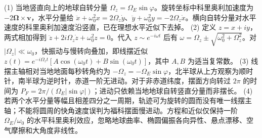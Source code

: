 (1) 当地竖直向上的地球自转分量 \(\Omega_z=\Omega_E\sin\varphi\)。旋转坐标中科里奥利加速度为 \(-2\boldsymbol\Omega\times\boldsymbol v\)，水平分量给 \(\ddot x+\omega_0^2x=2\Omega_z\dot y\)、\(\ddot y+\omega_0^2y=-2\Omega_z\dot x\)。横向自转分量对水平速度的科里奥利加速度沿竖直，已在理想水平近似下去掉。
(2) 定义 \(z=x+iy\)，两式相加得到 \(\ddot z+2i\Omega_z\dot z+\omega_0^2z=0\)。代入 \(z\sim e^{-i\omega t}\) 后有 \(\omega=\Omega_z\pm\sqrt{\omega_0^2+\Omega_z^2}\)。对 \(|\Omega_z|\ll\omega_0\)，快振动与慢转向叠加，即线摆近似 \(z(t)=e^{-i\Omega_zt}[A\cos(\omega_0t)+B\sin(\omega_0t)]\)，其中 \(A,B\) 为适当复常数。
(3) 线摆主轴相对当地地面每秒转角约为 \(-\Omega_z=-\Omega_E\sin\varphi\)，北半球从上方观察为顺时针，南半球为逆时针，赤道一阶无进动。对于非赤道纬度，摆面方向转过 \(2\pi\) 的时间为 \(P_F=2\pi/(\Omega_E|\sin\varphi|)\)；进动只依赖当地地球自转竖直分量而非摆长。
(4) 若两个水平分量等幅且相差四分之一周期，轨迹可为旋转的圆而没有唯一线摆主轴；不能将圆周的快角速度误判为福科摆面慢进动。方程和近似仅保持一阶 \(\Omega_E/\omega_0\) 的水平科里奥利效应，忽略地球曲率、椭圆偏振各向异性、悬点漂移、空气摩擦和大角度非线性。
